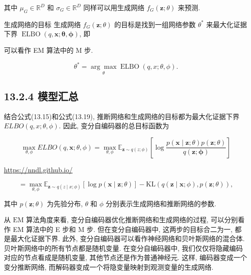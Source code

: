 \documentclass[10pt]{article}
\begin{document}
其中 $\mu_{G} \in \mathbb{R}^{D}$ 和 $\sigma_{G} \in \mathbb{R}^{D}$ 同样可以用生成网络 $f_{G}(\boldsymbol{z} ; \theta)$ 来预测.

生成网络的目标 生成网络 $f_{G}(\boldsymbol{z} ; \theta)$ 的目标是找到一组网络参数 $\theta^{*}$ 来最大化证据下界 $\operatorname{ELBO}(q, \boldsymbol{x} ; \boldsymbol{\theta}, \boldsymbol{\phi})$, 即

可以看作 EM 算法中的 M 步.


\begin{equation*}
\theta^{*}=\underset{\theta}{\arg \max } \operatorname{ELBO}(q, x ; \theta, \phi) . \tag{13.19}
\end{equation*}


\subsection*{13.2.4 模型汇总}
结合公式(13.15)和公式(13.19), 推断网络和生成网络的目标都为最大化证据下界 $E L B O(q, x ; \theta, \phi)$. 因此, 变分自编码器的总目标函数为


\begin{equation*}
\max _{\theta, \phi} E L B O(q, \boldsymbol{x} ; \theta, \phi)=\max _{\theta, \phi} \mathbb{E}_{\boldsymbol{z} \sim q(z ; \phi)}\left[\log \frac{p(\boldsymbol{x} \mid \boldsymbol{z} ; \theta) p(\boldsymbol{z} ; \theta)}{q(\boldsymbol{z} ; \boldsymbol{\phi})}\right] \tag{13.20}
\end{equation*}


\href{https://nndl.github.io/}{https://nndl.github.io/}


\begin{equation*}
=\max _{\theta, \phi} \mathbb{E}_{\boldsymbol{z} \sim q(z \mid x ; \phi)}[\log p(\boldsymbol{x} \mid \boldsymbol{z} ; \theta)]-\mathrm{KL}(q(\boldsymbol{z} \mid \boldsymbol{x} ; \phi), p(\boldsymbol{z} ; \theta)), \tag{13.21}
\end{equation*}


其中 $p(\boldsymbol{z} ; \theta)$ 为先验分布, $\theta$ 和 $\phi$ 分别表示生成网络和推断网络的参数.

从 $\mathrm{EM}$ 算法角度来看, 变分自编码器优化推断网络和生成网络的过程, 可以分别看作 EM 算法中的 E 步和 $\mathrm{M}$ 步. 但在变分自编码器中, 这两步的目标合二为一, 都是最大化证据下界. 此外, 变分自编码器可以看作神经网络和贝叶斯网络的混合体. 贝叶斯网络中的所有节点都是随机变量. 在变分自编码器中, 我们仅仅将隐藏编码对应的节点看成是随机变量, 其他节点还是作为普通神经元. 这样, 编码器变成一个变分推断网络, 而解码器变成一个将隐变量映射到观测变量的生成网络.
\end{document}
